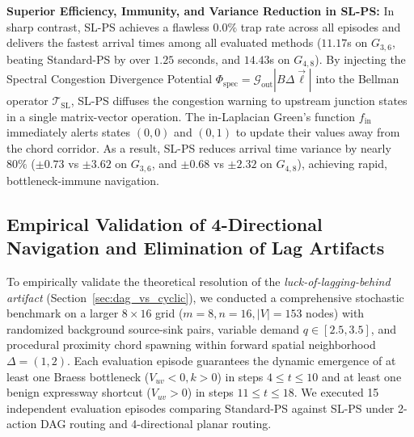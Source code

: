 \documentclass[11pt,a4paper]{article}
\begin{document}
\textbf{Superior Efficiency, Immunity, and Variance Reduction in SL-PS:}
In sharp contrast, SL-PS achieves a flawless $0.0\%$ trap rate across all episodes and delivers the fastest arrival times among all evaluated methods ($11.17$s on $G_{3,6}$, beating Standard-PS by over $1.25$ seconds, and $14.43$s on $G_{4,8}$). By injecting the Spectral Congestion Divergence Potential $\Phi_{\text{spec}} = \mathcal{G}_{\text{out}} |B \Delta \vec{\ell}|$ into the Bellman operator $\mathcal{T}_{\text{SL}}$, SL-PS diffuses the congestion warning to upstream junction states in a single matrix-vector operation. The in-Laplacian Green's function $f_{\text{in}}$ immediately alerts states $(0, 0)$ and $(0, 1)$ to update their values away from the chord corridor. As a result, SL-PS reduces arrival time variance by nearly $80\%$ ($\pm 0.73$ vs $\pm 3.62$ on $G_{3,6}$, and $\pm 0.68$ vs $\pm 2.32$ on $G_{4,8}$), achieving rapid, bottleneck-immune navigation.

\subsection{Empirical Validation of 4-Directional Navigation and Elimination of Lag Artifacts}
\label{sec:exp_4directional}

To empirically validate the theoretical resolution of the \textit{luck-of-lagging-behind artifact} (Section~\ref{sec:dag_vs_cyclic}), we conducted a comprehensive stochastic benchmark on a larger $8 \times 16$ grid ($m=8, n=16, |V|=153$ nodes) with randomized background source-sink pairs, variable demand $q \in [2.5, 3.5]$, and procedural proximity chord spawning within forward spatial neighborhood $\Delta = (1, 2)$. Each evaluation episode guarantees the dynamic emergence of at least one Braess bottleneck ($V_{uv} < 0, k > 0$) in steps $4 \le t \le 10$ and at least one benign expressway shortcut ($V_{uv} > 0$) in steps $11 \le t \le 18$. We executed 15 independent evaluation episodes comparing Standard-PS against SL-PS under 2-action DAG routing and 4-directional planar routing.
\end{document}
